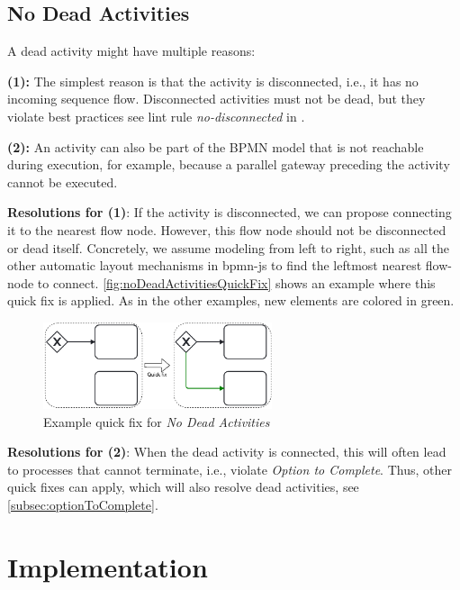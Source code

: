 \documentclass[runningheads]{llncs}
\begin{document}
\subsection{No Dead Activities}
A dead activity might have multiple reasons:

\textbf{(1):} The simplest reason is that the activity is disconnected, i.e., it has no incoming sequence flow.
Disconnected activities must not be dead, but they violate best practices see lint rule \textit{no-disconnected} in \cite{camundaservicesgmbhBpmnlint2024}.

\textbf{(2):} An activity can also be part of the BPMN model that is not reachable during execution, for example, because a parallel gateway preceding the activity cannot be executed.

\textbf{Resolutions for (1)}: If the activity is disconnected, we can propose connecting it to the nearest flow node.
However, this flow node should not be disconnected or dead itself.
Concretely, we assume modeling from left to right, such as all the other automatic layout mechanisms in bpmn-js \cite{camundaservicesgmbhBpmnjs2024} to find the leftmost nearest flow-node to connect.
\autoref{fig:noDeadActivitiesQuickFix} shows an example where this quick fix is applied.
As in the other examples, new elements are colored in green.

\begin{figure}[ht]
	\centering
	\includegraphics[width=0.6\textwidth]{images/dead}
	\caption{Example quick fix for \textit{No Dead Activities}}
	\label{fig:noDeadActivitiesQuickFix}
\end{figure}

\textbf{Resolutions for (2)}: When the dead activity is connected, this will often lead to processes that cannot terminate, i.e., violate \textit{Option to Complete}.
Thus, other quick fixes can apply, which will also resolve dead activities, see \autoref{subsec:optionToComplete}.

\section{Implementation}
\end{document}
